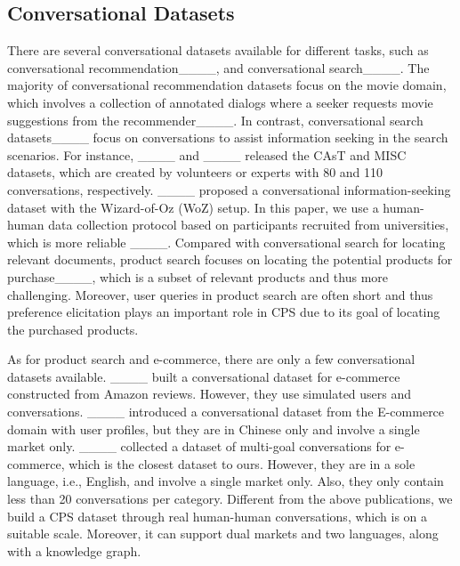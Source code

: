 \subsection{Conversational Datasets}
There are several conversational datasets available for different tasks, such as conversational recommendation____, and conversational search____. The majority of conversational recommendation datasets focus on the movie domain, which involves a collection of annotated dialogs where a seeker requests movie suggestions from the recommender____. In contrast, conversational search datasets____ focus on conversations to assist information seeking in the search scenarios. For instance, ____ and ____ released the CAsT and MISC datasets, which are created by volunteers or experts with 80 and 110 conversations, respectively. %
____ proposed a conversational information-seeking dataset with the Wizard-of-Oz (WoZ) setup. In this paper, we use a human-human data collection protocol based on participants recruited from universities, which is more reliable ____. 
Compared with conversational search for locating relevant documents, product search focuses on locating the potential products for purchase____, which is a subset of relevant products and thus more challenging. Moreover, user queries in product search are often short and thus preference elicitation plays an important role in \ac{CPS} due to its goal of locating the purchased products. 

As for product search and e-commerce, there are only a few conversational datasets available. ____ built a conversational dataset for e-commerce constructed from Amazon reviews. However, they use simulated users and conversations. ____ introduced a conversational dataset from the E-commerce domain with user profiles, but they are in Chinese only and involve a single market only. ____ collected a dataset of multi-goal conversations for e-commerce, which is the closest dataset to ours. However, they are in a sole language, i.e., English, and involve a single market only. Also, they only contain less than 20 conversations per category. Different from the above publications, we build a \ac{CPS} dataset through real human-human conversations, which is on a suitable scale. Moreover, it can support dual markets and two languages, along with a knowledge graph.

